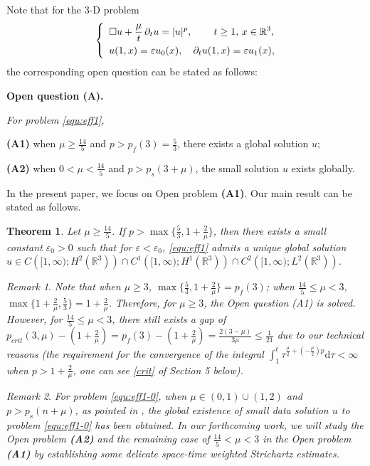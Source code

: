\documentclass[11pt,twoside]{article}
\newcommand{\p}{\partial}
\newcommand{\ve}{\varepsilon}
\newcommand{\f}{\frac}
\theoremstyle{plain}
\newtheorem{theorem}{Theorem}[section]
\theoremstyle{definition}
\theoremstyle{remark}
\newtheorem{remark}{Remark}[section]
\numberwithin{equation}{section}
\begin{document}
Note that for the 3-D problem
\begin{equation}\label{equ:eff1}
\left\{ \enspace
\begin{aligned}
&\square u+\f{\mu}{t}\,\p_tu=|u|^p, \,\qquad t\geq1,\, x\in\Bbb R^3,\\
&u(1,x)=\ve u_0(x), \quad \partial_{t} u(1,x)=\ve u_1(x),
\end{aligned}
\right.
\end{equation}
the corresponding open question can be stated as follows:

{\bf Open question (A).} {\it For problem \eqref{equ:eff1},

{\bf (A1)} when $\mu\ge \f{14}{5}$ and $p>p_f(3)=\f{5}{3}$, there exists a global solution $u$;

{\bf (A2)} when $0<\mu<\f{14}{5}$ and $p>p_s(3+\mu)$, the small solution $u$ exists globally.
}

In the present paper, we focus on Open problem {\bf (A1)}.
Our main result can be stated as follows.
\begin{theorem}\label{YH-1}
Let $\mu\geq\f{14}{5}$. If
$p>\max\{\f{5}{3}, 1+\f{2}{\mu}\}$, then
there exists a small constant $\varepsilon_0>0$ such that for $\ve<\ve_0$,
\eqref{equ:eff1} admits a unique global solution $u\in C\left([1, \infty) ; H^{2} (\mathbb R^3) \right) \cap C^{1}\left([1, \infty) ; H^{1}(\mathbb R^3) \right)\cap C^{2}\left([1, \infty) ; L^{2}(\mathbb R^3) \right)$.
\end{theorem}

\begin{remark}\label{re-0}
{\it Note that when $\mu\geq3$, $\max\{\f{5}{3}, 1+\f{2}{\mu}\}=p_f(3)$; when $\f{14}{5}\leq\mu<3$, $\max\{1+\f{2}{\mu}, \f{5}{3}\}=1+\f{2}{\mu}$.
Therefore, for $\mu\ge 3$, the Open question (A1) is solved. However, for $\f{14}{5}\leq\mu<3$, there still exists a gap
of $p_{crit}(3,\mu)-(1+\f{2}{\mu})=p_f(3)-(1+\f{2}{\mu})=\f{2(3-\mu)}{3\mu}\le\f{1}{21}$ due to our technical reasons
(the requirement  for the convergence of the integral $\int_{1}^{t} \tau^{\f{\mu}{2}+(-\f{\mu}{2})p}\mathrm{d}\tau<\infty$ when $p>1+\f{2}{\mu}$,
one can see \eqref{crit} of Section 5 below).}
\end{remark}


\begin{remark}\label{re-3}
{\it For problem \eqref{equ:eff1-0}, when $\mu\in (0,1)\cup (1,2)$ and $p>p_s(n+\mu)$,
as pointed in  \cite[Remark 1.14]{HLY}, the global existence of small data solution $u$ to problem \eqref{equ:eff1-0} has been obtained.
In our forthcoming work, we will study the Open problem {\bf (A2)} and the remaining case of $\f{14}{5}<\mu<3$ in the Open problem {\bf (A1)}
by establishing some delicate space-time weighted Strichartz estimates.}
\end{remark}
\end{document}
